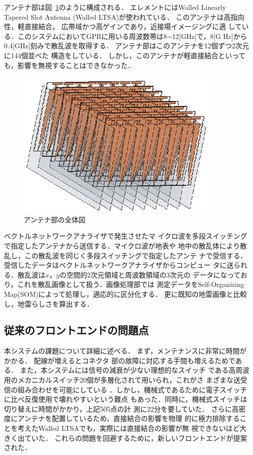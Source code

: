 ﻿\documentclass[12pt,oneside]{jsbook}
\begin{document}
アンテナ部は図~\ref{pic:transmit}のように構成される．
エレメントにはWalled Linearly Tapered Slot Antenna
 (Walled LTSA)\cite{2007SMas}が使われている．
このアンテナは高指向性，軽直接結合，
広帯域かつ高ゲインであり，近接場イメージングに適
している．このシステムにおいてGPRに用いる周波数帯は8$\sim$12[GHz]で，8[G
Hz]から0.4[GHz]刻みで散乱波を取得する．
アンテナ部はこのアンテナを12個ずつ2次元に144個並べた
構造をしている．
しかし，このアンテナが軽直接結合といっても，影響を無視することはできなかった．

\begin{figure}[hbtp]
\begin{center}
\includegraphics[width=\hsize]{LTSA.eps}
\caption{アンテナ部の全体図} \label{pic:transmit} 
\end{center}
\end{figure}
ベクトルネットワークアナライザで発生させたマ
イクロ波を多段スイッチングで指定したアンテナから送信する．マイクロ波が地表や
地中の散乱体により散乱し，この散乱波を同じく多段スイッチングで指定したアンテ
ナで受信する．受信したデータはベクトルネットワークアナライザからコンピュー
タに送られる．散乱波は$x$，$y$の空間的2次元領域と周波数領域の3次元の
データになっており，これを散乱画像として扱う．画像処理部では
測定データをSelf-Organizing Map(SOM)によって処理し，適応的に区分化する．
更に既知の地雷画像と比較し，地雷らしさを算出する．
\subsection{従来のフロントエンドの問題点}
本システムの課題について詳細に述べる．
まず，メンテナンスに非常に時間がかかる．
配線が増えるとコネクタ
部の故障に対応する手間も増えるためである．
また，本システムには信号の減衰が少ない理想的なスイッチ
である高周波用のメカニカルスイッチ20個が多層化されて用いられ，これがさ
まざまな送受信の組み合わせを可能にしている\cite{2008SMas}
．しかし，機械式であるために電子スイッチに比べ反復使用で壊れやすいという難点
もあった．同時に，機械式スイッチは切り替えに時間がかかり，上記505点の計
測に22分を要していた．
さらに高密度にアンテナを配置しているため，直接結合の影響を物理
的に極力排除することを考えたWalled LTSAでも，実際には直接結合の影響が無
視できないほど大きく出ていた．
これらの問題を回避するために，新しいフロントエンドが提案された．
\end{document}

